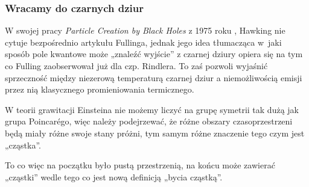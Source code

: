 \documentclass[10pt,t]{beamer}
\begin{document}
\begin{frame}
  \frametitle{Wracamy do czarnych dziur}


  W swojej pracy \textit{Particle Creation by Black Holes} z 1975 roku
  \cite{HawkingParticleCreationByBlackHole1975}, Hawking nie cytuje
  bezpośrednio artykułu Fullinga, jednak jego idea tłumacząca w~jaki
  sposób pole kwantowe może „znaleźć wyjście” z czarnej dziury opiera
  się na tym co Fulling zaobserwował już dla czp. Rindlera. To zaś
  pozwoli wyjaśnić sprzeczność między niezerową temperaturą czarnej
  dziur a niemożliwością emisji przez nią klasycznego promieniowania
  termicznego.

  W teorii grawitacji Einsteina nie możemy liczyć na grupę symetrii
  tak dużą jak grupa Poincar\'{e}go, więc należy podejrzewać, że różne
  obszary czasoprzestrzeni będą miały różne swoje stany próżni, tym
  samym różne znaczenie tego czym jest „cząstka”.

  To co więc na początku było pustą przestrzenią, na końcu może
  zawierać „cząstki” wedle tego co jest nową definicją „bycia
  cząstką”.

\end{frame}
\end{document}
